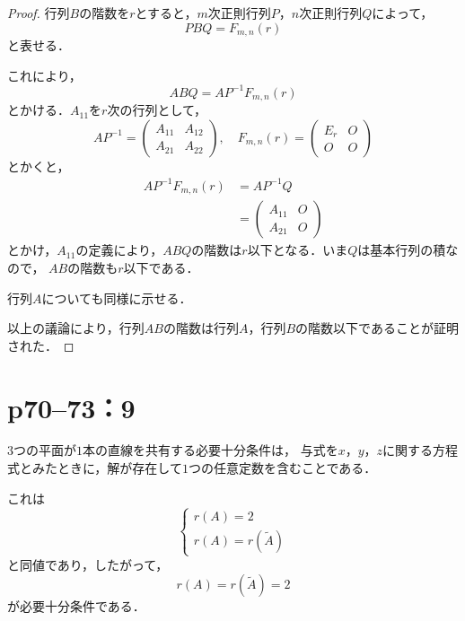 \documentclass[a4paper,10pt,fleqn]{ltjsarticle}
\begin{document}
\begin{leftbar}
    \begin{proof}
        行列$B$の階数を$r$とすると，$m$次正則行列$P$，$n$次正則行列$Q$によって，
        \[
            P B Q = F_{m,n} (r)
        \]
        と表せる．

        これにより，
        \[
            ABQ = A P^{-1} F_{m,n} (r)
        \]
        とかける．$A_{11}$を$r$次の行列として，
        \[
            A P^{-1} = \begin{pmatrix} A_{11} & A_{12} \\ A_{21} & A_{22} \end{pmatrix}, \quad F_{m,n} (r) = \begin{pmatrix} E_r & O \\ O & O \end{pmatrix}
        \]
        とかくと，
        \begin{align*}
            A P^{-1} F_{m,n} (r) & = A P^{-1} Q                                            \\
                                 & = \begin{pmatrix} A_{11}& O \\ A_{21} & O \end{pmatrix}
        \end{align*}
        とかけ，$A_{11}$の定義により，$ABQ$の階数は$r$以下となる．いま$Q$は基本行列の積なので， $AB$の階数も$r$以下である．

        行列$A$についても同様に示せる．

        以上の議論により，行列$AB$の階数は行列$A$，行列$B$の階数以下であることが証明された．

    \end{proof}
\end{leftbar}

\newpage


\section*{p70--73：9}

\begin{tleftbar}
    $3$つの平面が$1$本の直線を共有する必要十分条件は，
    与式を$x$，$y$，$z$に関する方程式とみたときに，解が存在して$1$つの任意定数を含むことである．

    これは
    \[
        \begin{cases}
            r(A)=2 \\
            r(A)=r(\tilde{A})
        \end{cases}
    \]
    と同値であり，したがって，
    \[
        r(A)=r(\tilde{A})=2
    \]
    が必要十分条件である．
\end{tleftbar}
\end{document}

